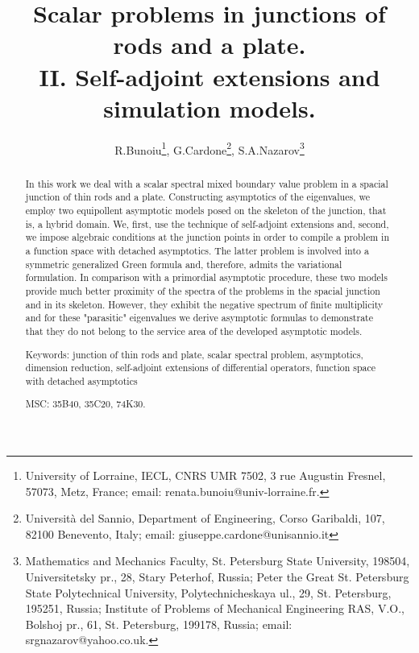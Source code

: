 \documentclass[11pt]{article}%
\numberwithin{equation}{section}
\begin{document}
\title{Scalar problems in junctions of rods and a plate. \\II. Self-adjoint extensions and simulation models.}
\author{R.Bunoiu\thanks{University of Lorraine, IECL, CNRS UMR 7502, 3 rue Augustin
Fresnel, 57073, Metz, France; email: renata.bunoiu@univ-lorraine.fr.},
G.Cardone\thanks{Universit\`{a} del Sannio, Department of Engineering, Corso
Garibaldi, 107, 82100 Benevento, Italy; email: giuseppe.cardone@unisannio.it},
S.A.Nazarov\thanks{Mathematics and Mechanics Faculty, St. Petersburg State
University, 198504, Universitetsky pr., 28, Stary Peterhof, Russia; Peter the
Great St. Petersburg State Polytechnical University, Polytechnicheskaya ul.,
29, St. Petersburg, 195251, Russia; Institute of Problems of Mechanical
Engineering RAS, V.O., Bolshoj pr., 61, St. Petersburg, 199178, Russia; email:
srgnazarov@yahoo.co.uk.}}
\maketitle

\begin{abstract}
\medskip In this work we deal with a scalar spectral mixed boundary value
problem in a spacial junction of thin rods and a plate. Constructing
asymptotics of the eigenvalues, we employ two equipollent asymptotic models
posed on the skeleton of the junction, that is, a hybrid domain. We, first,
use the technique of self-adjoint extensions and, second, we impose algebraic
conditions at the junction points in order to compile a problem in a function
space with detached asymptotics. The latter problem is involved into a
symmetric generalized Green formula and, therefore, admits the variational
formulation. In comparison with a primordial asymptotic procedure, these two
models provide much better proximity of the spectra of the problems in the
spacial junction and in its skeleton. However, they exhibit the negative
spectrum of finite multiplicity and for these "parasitic" eigenvalues we
derive asymptotic formulas to demonstrate that they do not belong to the
service area of the developed asymptotic models.

\medskip

Keywords: junction of thin rods and plate, scalar spectral problem,
asymptotics, dimension reduction, self-adjoint extensions of differential
operators, function space with detached asymptotics

\medskip

MSC: 35B40, 35C20, 74K30.

\end{abstract}
\end{document}

